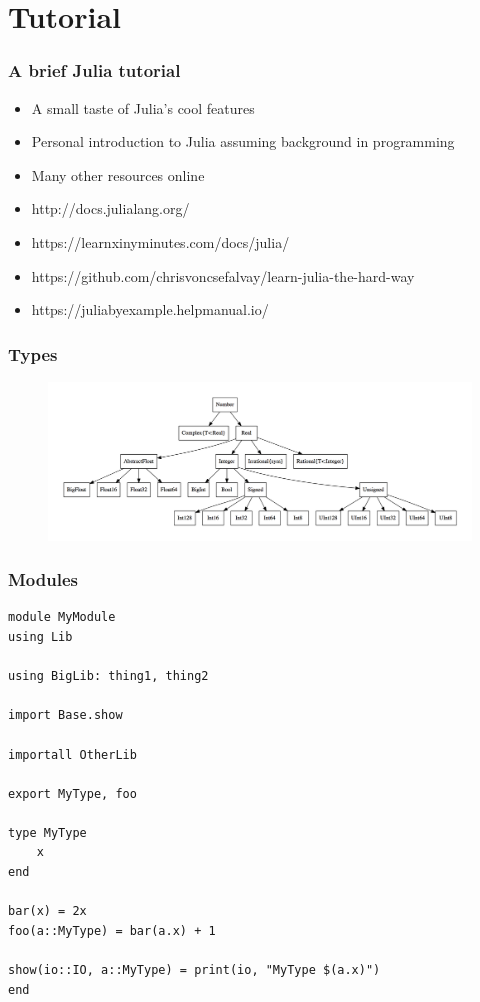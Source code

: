 \section{Tutorial}
\begin{frame}
	\frametitle{A brief Julia tutorial}
  \begin{itemize}
    \item A small taste of Julia's cool features
    \item Personal introduction to Julia assuming background in programming
    \item Many other resources online
    \item http://docs.julialang.org/
    \item https://learnxinyminutes.com/docs/julia/
    \item https://github.com/chrisvoncsefalvay/learn-julia-the-hard-way
    \item https://juliabyexample.helpmanual.io/
  \end{itemize}
\end{frame}

\begin{frame}
	\frametitle{Types}
  \begin{figure}[ht]
    \centering
    \includegraphics[width=1.0\textwidth]{types}
  \end{figure}
\end{frame}

\begin{frame}[fragile]
	\frametitle{Modules}
  \begin{tiny}
  \begin{verbatim}
module MyModule
using Lib

using BigLib: thing1, thing2

import Base.show

importall OtherLib

export MyType, foo

type MyType
    x
end

bar(x) = 2x
foo(a::MyType) = bar(a.x) + 1

show(io::IO, a::MyType) = print(io, "MyType $(a.x)")
end
  \end{verbatim}
  \end{tiny}
\end{frame}

